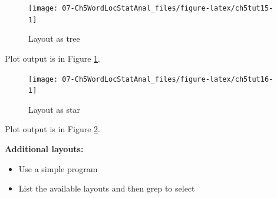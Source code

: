 \documentclass[
]{article}
\newenvironment{Shaded}{\begin{snugshade}}{\end{snugshade}}
\newcommand{\AttributeTok}[1]{\textcolor[rgb]{0.13,0.29,0.53}{#1}}
\newcommand{\DecValTok}[1]{\textcolor[rgb]{0.00,0.00,0.81}{#1}}
\newcommand{\FunctionTok}[1]{\textcolor[rgb]{0.13,0.29,0.53}{\textbf{#1}}}
\newcommand{\NormalTok}[1]{#1}
\newcommand{\SpecialCharTok}[1]{\textcolor[rgb]{0.81,0.36,0.00}{\textbf{#1}}}
\newcommand{\StringTok}[1]{\textcolor[rgb]{0.31,0.60,0.02}{#1}}
\providecommand{\tightlist}{%
  \setlength{\itemsep}{0pt}\setlength{\parskip}{0pt}}
\begin{document}
\begin{figure}

{\centering \texttt{[image: 07-Ch5WordLocStatAnal\_files/figure-latex/ch5tut15-1]} 

}

\caption{Layout as tree}\label{fig:ch5tut15}
\end{figure}

Plot output is in Figure \ref{fig:ch5tut15}.

\begin{Shaded}
\end{Shaded}

\begin{figure}

{\centering \texttt{[image: 07-Ch5WordLocStatAnal\_files/figure-latex/ch5tut16-1]} 

}

\caption{Layout as star}\label{fig:ch5tut16}
\end{figure}

Plot output is in Figure \ref{fig:ch5tut16}.

\textbf{Additional layouts:}

\begin{itemize}
\tightlist
\item
  Use a simple program
\item
  List the available layouts and then grep to select
\end{itemize}
\end{document}
